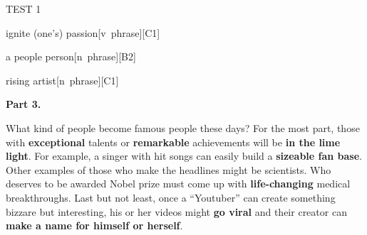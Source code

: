 \begin{glossarymc}[Cambridge 5]
\begin{test}{TEST 1}
\begin{VocabExplain}[Part 2]
            \begin{ExplainCard}{ignite (one’s) passion}[v~phrase][C1]
            \end{ExplainCard}

            \begin{ExplainCard}{a people person}[n~phrase][B2]
            \end{ExplainCard}

            \begin{ExplainCard}{rising artist}[n~phrase][C1]
            \end{ExplainCard}
        \end{VocabExplain}

    \noindent
    \textbf{Part 3.}
    \begin{qa}{What kind of people become famous people these days?}
    For the most part, those with \textbf{exceptional} talents or \textbf{remarkable} achievements will be \textbf{in the lime light}. For example, a singer with hit songs can easily build a \textbf{sizeable fan base}. Other examples of those who make the headlines might be scientists. Who deserves to be awarded Nobel prize must come up with \textbf{life-changing} medical breakthroughs. Last but not least, once a “Youtuber” can create something bizzare but interesting, his or her videos might \textbf{go viral} and their creator can \textbf{make a name for himself or herself}.
    \end{qa}


\end{test}
\end{glossarymc}

